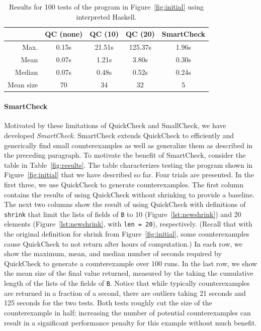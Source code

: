 \documentclass[10pt]{sigplanconf}
\newcommand{\ttp}[1]{\texttt{#1}}
\begin{document}
\begin{table}[ht]
\footnotesize
  \begin{center}
    \begin{tabular}{|r||c|c|c|c|}
\hline
 & QC (none) & QC (10) & QC (20) & SmartCheck \\
\hline \hline
Max.  & 0.15s & 21.51s & 125.37s & 1.96s\\
\hline
Mean  & 0.07s & 1.21s & 3.80s & 0.30s\\
\hline
Median & 0.07s & 0.48s & 0.52s & 0.24s\\
\hline
Mean size & 70 & 34 & 32 & 5\\
\hline
    \end{tabular}
  \end{center}
  \caption{Results for 100 tests of the program in Figure~\ref{fig:initial}
    using interpreted Haskell.}
  \label{table:results}
\end{table}


\paragraph{SmartCheck}
Motivated by these limitations of QuickCheck and SmallCheck, we have developed
\emph{SmartCheck}.  SmartCheck extends QuickCheck to efficiently and generically
find small counterexamples as well as generalize them as described in the
preceding paragraph.  To motivate the benefit of SmartCheck, consider the table
in Table~\ref{fig:results}.  The table characterizes testing the program shown
in Figure~\ref{fig:initial} that we have described so far.  Four trials are
presented.  In the first three, we use QuickCheck to generate counterexamples.
The first column contains the results of using QuickCheck without shrinking to
provide a baseline.  The next two columns show the result of using QuickCheck
with definitions of \ttp{shrink} that limit the lists of fields of \ttp{B} to 10
(Figure~\ref{lst:newshrink}) and 20 elements (Figure~\ref{lst:newshrink}, with
\ttp{len = 20}), respectively.  (Recall that with the original definition for
shrink from Figure~\ref{fig:initial}, some counterexamples cause QuickCheck to
not return after hours of computation.)  In each row, we show the maximum, mean,
and median number of seconds required by QuickCheck to generate a counterexample
over 100 runs.  In the last row, we show the mean size of the final value
returned, measured by the taking the cumulative length of the lists of the
fields of \ttp{B}.  Notice that while typically counterexamples are returned in
a fraction of a second, there are outliers taking 21 seconds and 125 seconds for
the two tests.  Both tests roughly cut the size of the counterexample in half;
increasing the number of potential counterexamples can result in a significant
performance penalty for this example without much benefit.
\end{document}
